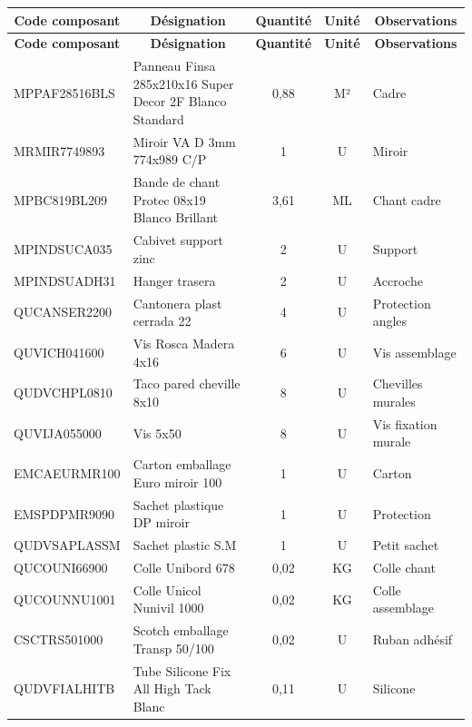 \documentclass[12pt,a4paper]{article}
\begin{document}
\begin{longtable}{|p{4cm}|p{6cm}|c|c|p{3cm}|}
\hline
\multicolumn{1}{|c|}{\textbf{Code composant}} & \multicolumn{1}{c|}{\textbf{Désignation}} & \multicolumn{1}{c|}{\textbf{Quantité}} & \multicolumn{1}{c|}{\textbf{Unité}} & \multicolumn{1}{c|}{\textbf{Observations}} \\
\hline
\endfirsthead
\hline
\multicolumn{1}{|c|}{\textbf{Code composant}} & \multicolumn{1}{c|}{\textbf{Désignation}} & \multicolumn{1}{c|}{\textbf{Quantité}} & \multicolumn{1}{c|}{\textbf{Unité}} & \multicolumn{1}{c|}{\textbf{Observations}} \\
\hline
\endhead
\hline
\endfoot
MPPAF28516BLS & Panneau Finsa 285x210x16 Super Decor 2F Blanco Standard & 0,88 & M² & Cadre \\
MRMIR7749893 & Miroir VA D 3mm 774x989 C/P & 1 & U & Miroir \\
MPBC819BL209 & Bande de chant Protec 08x19 Blanco Brillant & 3,61 & ML & Chant cadre \\
MPINDSUCA035 & Cabivet support zinc & 2 & U & Support \\
MPINDSUADH31 & Hanger trasera & 2 & U & Accroche \\
QUCANSER2200 & Cantonera plast cerrada 22 & 4 & U & Protection angles \\
QUVICH041600 & Vis Rosca Madera 4x16 & 6 & U & Vis assemblage \\
QUDVCHPL0810 & Taco pared cheville 8x10 & 8 & U & Chevilles murales \\
QUVIJA055000 & Vis 5x50 & 8 & U & Vis fixation murale \\
EMCAEURMR100 & Carton emballage Euro miroir 100 & 1 & U & Carton \\
EMSPDPMR9090 & Sachet plastique DP miroir & 1 & U & Protection \\
QUDVSAPLASSM & Sachet plastic S.M & 1 & U & Petit sachet \\
QUCOUNI66900 & Colle Unibord 678 & 0,02 & KG & Colle chant \\
QUCOUNNU1001 & Colle Unicol Nunivil 1000 & 0,02 & KG & Colle assemblage \\
CSCTRS501000 & Scotch emballage Transp 50/100 & 0,02 & U & Ruban adhésif \\
QUDVFIALHITB & Tube Silicone Fix All High Tack Blanc & 0,11 & U & Silicone \\
\hline
\end{longtable}
\end{document}
